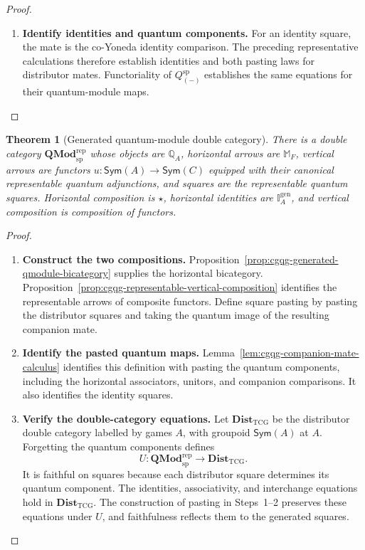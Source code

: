 \documentclass[oneside]{article}
\newcommand{\Sym}{\mathsf{Sym}}
\theoremstyle{plain}
\newtheorem{theorem}{Theorem}[section]
\theoremstyle{definition}
\theoremstyle{remark}
\begin{document}
\begin{proof}
\begin{enumerate}[beginpenalty=10000]
        \item \textbf{Identify identities and quantum components.}
        For an identity square, the mate is the co-Yoneda identity
        comparison. The preceding representative calculations therefore
        establish identities and both pasting laws for distributor mates.
        Functoriality of \(Q_{(-)}^{\mathrm{sp}}\) establishes the same
        equations for their quantum-module maps. \qedhere
    \end{enumerate}
\end{proof}

\begin{theorem}[Generated quantum-module double category]
\label{thm:cgqg-generated-qmodule-double-category}
There is a double category \(\mathbf{QMod}^{\mathrm{rep}}_{\mathrm{sp}}\)
whose objects are \(\mathbb Q_A\), horizontal arrows are \(\mathbb M_F\),
vertical arrows are functors \(u:\Sym(A)\to \Sym(C)\) equipped with their canonical
representable quantum adjunctions, and squares are the representable
quantum squares. Horizontal composition is \(\star\), horizontal identities
are \(\mathbb I_A^{\mathrm{gen}}\), and vertical composition is composition
of functors.
\end{theorem}
\begin{proof}
    \leavevmode
    \begin{enumerate}[beginpenalty=10000]
        \item \textbf{Construct the two compositions.}
        Proposition~\ref{prop:cgqg-generated-qmodule-bicategory}
        supplies the horizontal bicategory.
        Proposition~\ref{prop:cgqg-representable-vertical-composition}
        identifies the representable arrows of composite functors.
        Define square pasting by pasting the distributor squares and
        taking the quantum image of the resulting companion mate.

        \item \textbf{Identify the pasted quantum maps.}
        Lemma~\ref{lem:cgqg-companion-mate-calculus} identifies this
        definition with pasting the quantum components, including the
        horizontal associators, unitors, and companion comparisons.
        It also identifies the identity squares.

        \item \textbf{Verify the double-category equations.}
        Let \(\mathbf{Dist}_{\mathrm{TCG}}\) be the distributor double
        category labelled by games \(A\), with groupoid \(\Sym(A)\) at \(A\).
        Forgetting the quantum components defines
        \[
        U:\mathbf{QMod}^{\mathrm{rep}}_{\mathrm{sp}}
          \longrightarrow\mathbf{Dist}_{\mathrm{TCG}}.
        \]
        It is faithful on squares because each distributor square
        determines its quantum component. The identities, associativity,
        and interchange equations hold in \(\mathbf{Dist}_{\mathrm{TCG}}\).
        The construction of pasting in Steps~1--2 preserves these
        equations under \(U\), and faithfulness reflects them to the
        generated squares. \qedhere
    \end{enumerate}
\end{proof}
\end{document}
